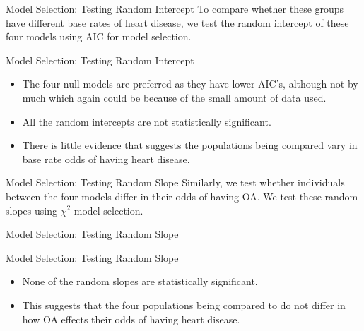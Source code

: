 
\begin{frame}{Model Selection: Testing Random Intercept}
To compare whether these groups have different base rates of heart disease, we test the random intercept of these four models using AIC for model selection.
    
\end{frame}

\begin{frame}{Model Selection: Testing Random Intercept}
\begin{itemize}
    \item The four null models are preferred as they have lower AIC's, although not by much which again could be because of the small amount of data used.
    \item All the random intercepts are not statistically significant.
    \item There is little evidence that suggests the populations being compared vary in base rate odds of having heart disease.
\end{itemize}
 
\end{frame}

\begin{frame}{Model Selection: Testing Random Slope}
Similarly, we test whether individuals between the four models differ in their odds of having OA. We test these random slopes using $\chi^2$ model selection.
\end{frame}

\begin{frame}{Model Selection: Testing Random Slope}
    
\end{frame}
\begin{frame}{Model Selection: Testing Random Slope}
\begin{itemize}
    \item None of the random slopes are statistically significant.
    \item This suggests that the four populations being compared to do not differ in how OA effects their odds of having heart disease. 
\end{itemize}
\end{frame}
